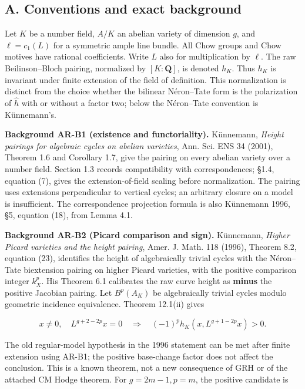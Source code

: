 \documentclass[11pt,a4paper]{article}
\begin{document}
\subsection{A. Conventions and exact
background}\label{a.-conventions-and-exact-background}

Let \(K\) be a number field, \(A/K\) an abelian variety of dimension
\(g\), and \(\ell=c_1(L)\) for a symmetric ample line bundle. All Chow
groups and Chow motives have rational coefficients. Write \(L\) also for
multiplication by \(\ell\). The raw Beilinson--Bloch pairing, normalized
by \([K:\mathbf Q]\), is denoted \(h_K\). Thus \(h_K\) is invariant
under finite extension of the field of definition. This normalization is
distinct from the choice whether the bilinear Néron--Tate form is the
polarization of \(\widehat h\) with or without a factor two; below the
Néron--Tate convention is Künnemann's.

\textbf{Background AR-B1 (existence and functoriality).} Künnemann,
\emph{Height pairings for algebraic cycles on abelian varieties}, Ann.
Sci. ENS 34 (2001), Theorem 1.6 and Corollary 1.7, give the pairing on
every abelian variety over a number field. Section 1.3 records
compatibility with correspondences; §1.4, equation (7), gives the
extension-of-field scaling before normalization. The pairing uses
extensions perpendicular to vertical cycles; an arbitrary closure on a
model is insufficient. The correspondence projection formula is also
Künnemann 1996, §5, equation (18), from Lemma 4.1.

\textbf{Background AR-B2 (Picard comparison and sign).} Künnemann,
\emph{Higher Picard varieties and the height pairing}, Amer. J. Math.
118 (1996), Theorem 8.2, equation (23), identifies the height of
algebraically trivial cycles with the Néron--Tate biextension pairing on
higher Picard varieties, with the positive comparison integer \(k_X^p\).
His Theorem 6.1 calibrates the raw curve height as \textbf{minus} the
positive Jacobian pairing. Let \(B^p(A_K)\) be algebraically trivial
cycles modulo geometric incidence equivalence. Theorem 12.1(ii) gives

\[
 x\ne0,\quad L^{g+2-2p}x=0
 \quad\Longrightarrow\quad
 (-1)^p h_K(x,L^{g+1-2p}x)>0.
\]

The old regular-model hypothesis in the 1996 statement can be met after
finite extension using AR-B1; the positive base-change factor does not
affect the conclusion. This is a known theorem, not a new consequence of
GRH or of the attached CM Hodge theorem. For \(g=2m-1,p=m\), the
positive candidate is
\end{document}
